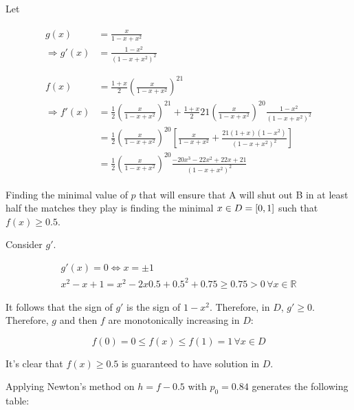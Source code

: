 \documentclass[../../../../Assignments]{subfiles}
\begin{document}
\begin{solution}
    Let

    \begin{gather*}
        \begin{aligned}
                         g(x) &= \frac{x}{1 - x + x^2} \\
            \Rightarrow g'(x) &= \frac{1 - x^2}{(1 - x + x^2)^2} \\
        \end{aligned} \\
        \begin{aligned}
                         f(x) &= \frac{1 + x}{2} \left(\frac{x}{1 - x + x^2}\right)^{21} \\
            \Rightarrow f'(x) &= \frac{1}{2} \left(\frac{x}{1 - x + x^2}\right)^{21} + \frac{1 + x}{2} 21 \left(\frac{x}{1 - x + x^2}\right)^{20} \frac{1 - x^2}{(1 - x + x^2)^2} \\
                              &= \frac{1}{2} \left(\frac{x}{1 - x + x^2}\right)^{20} \left[\frac{x}{1 - x + x^2} + \frac{21(1 + x)(1 - x^2)}{(1 - x + x^2)^2}\right] \\
                              &= \frac{1}{2} \left(\frac{x}{1 - x + x^2}\right)^{20} \frac{-20x^3 - 22x^2 + 22x + 21}{(1 - x + x^2)^2}
        \end{aligned}
    \end{gather*}

    Finding the minimal value of \(p\) that will ensure that A will shut out B
    in at least half the matches they play is finding the minimal \(x \in D =
    \interval{0}{1}\) such that \(f(x) \geq \num{0.5}\).

    Consider \(g'\).

    \begin{gather*}
        g'(x) = 0 \iff x = \pm 1 \\
        x^2 - x + 1 = x^2 - 2x\num{0.5} + \num{0.5}^2 + \num{0.75} \geq \num{0.75} > 0 \, \forall x \in \mathbb{R}
    \end{gather*}

    It follows that the sign of \(g'\) is the sign of \(1 - x^2\). Therefore, in
    \(D\), \(g' \geq 0\). Therefore, \(g\) and then \(f\) are monotonically
    increasing in \(D\):

    \[f(0) = 0 \leq f(x) \leq f(1) = 1 \, \forall x \in D\]

    It's clear that \(f(x) \geq \num{0.5}\) is guaranteed to have solution in
    \(D\).

    Applying Newton's method on \(h = f - \num{0.5}\) with \(p_0 = \num{0.84}\)
    generates the following table:


\end{solution}
\end{document}
